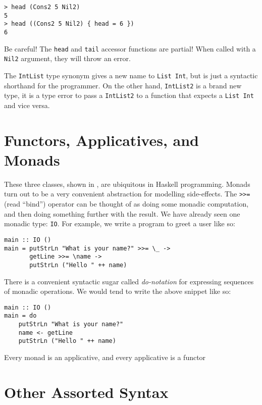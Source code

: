 \begin{verbatim}
> head (Cons2 5 Nil2)
5
> head ((Cons2 5 Nil2) { head = 6 })
6
\end{verbatim}

Be careful!  The \verb|head| and \verb|tail| accessor functions are partial!
When called with a \verb|Nil2| argument, they will throw an error.

\begin{figure}[b]
  \hrulefill
  \centering
  
  \label{fig:famonad}
\end{figure}

The \verb|IntList| type synonym gives a new name to \verb|List Int|, but is just
a syntactic shorthand for the programmer.  On the other hand, \verb|IntList2| is
a brand new type, it is a type error to pass a \verb|IntList2| to a function
that expects a \verb|List Int| and vice versa.

\section*{Functors, Applicatives, and Monads}

These three classes, shown in , are ubiquitous in Haskell
programming.  Monads turn out to be a very convenient abstraction for modelling
side-effects.  The \verb|>>=| (read ``bind'') operator can be thought of as
doing some monadic computation, and then doing something further with the
result.  We have already seen one monadic type: \verb|IO|.  For example, we
write a program to greet a user like so:

\begin{verbatim}
main :: IO ()
main = putStrLn "What is your name?" >>= \_ ->
       getLine >>= \name ->
       putStrLn ("Hello " ++ name)
\end{verbatim}

There is a convenient syntactic sugar called \emph{do-notation} for expressing
sequences of monadic operations.  We would tend to write the above snippet like
so:

\begin{verbatim}
main :: IO ()
main = do
    putStrLn "What is your name?"
    name <- getLine
    putStrLn ("Hello " ++ name)
\end{verbatim}

Every monad is an applicative, and every applicative is a functor

\section*{Other Assorted Syntax}

